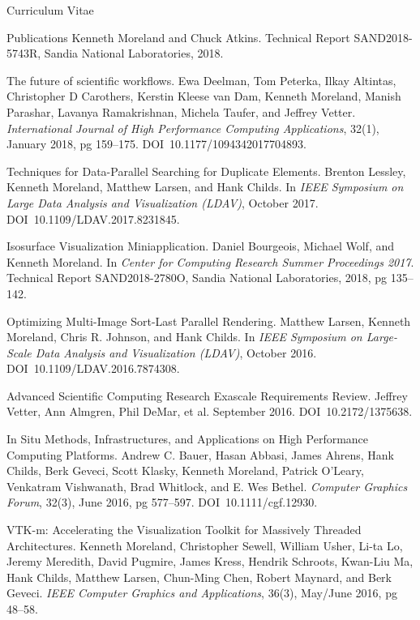 \documentclass{article}
\begin{document}
\begin{cv}{Curriculum Vitae}
\begin{cvlist}{Publications}
      Kenneth Moreland and Chuck Atkins.
      Technical Report SAND2018-5743R, Sandia National Laboratories, 2018.
    \item[The future of scientific workflows.]
      Ewa Deelman, Tom Peterka, Ilkay Altintas, Christopher D Carothers, Kerstin Kleese van Dam, Kenneth Moreland, Manish Parashar, Lavanya Ramakrishnan, Michela Taufer, and Jeffrey Vetter.
      \emph{International Journal of High Performance Computing Applications}, 32(1), January 2018, pg 159--175.
      DOI~10.1177/1094342017704893.
    \item[Techniques for Data-Parallel Searching for Duplicate Elements.]
      Brenton Lessley, Kenneth Moreland, Matthew Larsen, and Hank Childs.
      In \emph{IEEE Symposium on Large Data Analysis and Visualization (LDAV)}, October 2017.
      DOI~10.1109/LDAV.2017.8231845.
    \item[Isosurface Visualization Miniapplication.]
      Daniel Bourgeois, Michael Wolf, and Kenneth Moreland.
      In \emph{Center for Computing Research Summer Proceedings 2017}.
      Technical Report SAND2018-2780O, Sandia National Laboratories, 2018, pg 135--142. 
    \item[Optimizing Multi-Image Sort-Last Parallel Rendering.]
      Matthew Larsen, Kenneth Moreland, Chris R. Johnson, and Hank Childs.
      In \emph{IEEE Symposium on Large-Scale Data Analysis and Visualization (LDAV)}, October 2016.
      DOI~10.1109/LDAV.2016.7874308.
    \item[Advanced Scientific Computing Research Exascale Requirements Review.]
      Jeffrey Vetter, Ann Almgren, Phil DeMar, et al.
      September 2016.
      DOI~10.2172/1375638.
    \item[In Situ Methods, Infrastructures, and Applications on High Performance]~\\ Computing Platforms.
      Andrew C. Bauer, Hasan Abbasi, James Ahrens, Hank Childs, Berk Geveci, Scott Klasky, Kenneth Moreland, Patrick O'Leary, Venkatram Vishwanath, Brad Whitlock, and E. Wes Bethel.
      \emph{Computer Graphics Forum}, 32(3), June 2016, pg 577--597.
      DOI~10.1111/cgf.12930.
    \item[VTK-m: Accelerating the Visualization Toolkit for Massively Threaded]~\\ Architectures.
      Kenneth Moreland, Christopher Sewell, William Usher, Li-ta Lo, Jeremy Meredith, David Pugmire, James Kress, Hendrik Schroots, Kwan-Liu Ma, Hank Childs, Matthew Larsen, Chun-Ming Chen, Robert Maynard, and Berk Geveci.
      \emph{IEEE Computer Graphics and Applications}, 36(3), May/June 2016, pg 48--58.

\end{cvlist}
\end{cv}
\end{document}
